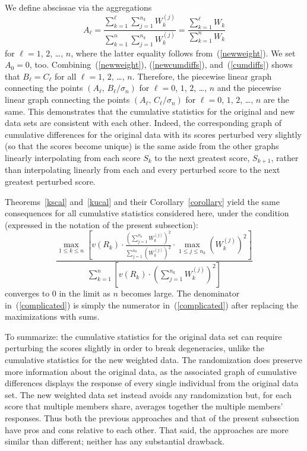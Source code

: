 \documentclass[12pt]{article}
\begin{document}
We define abscissae via the aggregations
%
\begin{equation}
A_{\ell} = \frac{\sum_{k=1}^{\ell} \sum_{j=1}^{n_k} W_k^{(j)}}
                {\sum_{k=1}^n \sum_{j=1}^{n_k} W_k^{(j)}}
         = \frac{\sum_{k=1}^{\ell} W_k}{\sum_{k=1}^n W_k}
\end{equation}
%
for $\ell = 1$, $2$, \dots, $n$, where the latter equality
follows from~(\ref{newweight}). We set $A_0 = 0$, too.
Combining~(\ref{newweight}), (\ref{newcumdiffs}), and~(\ref{cumdiffs})
shows that $B_{\ell} = C_{\ell}$
for all $\ell = 1$, $2$, \dots, $n$.
Therefore, the piecewise linear graph connecting
the points $(A_{\ell},\,B_{\ell} / \sigma_n)$
for $\ell = 0$, $1$, $2$, \dots, $n$
and the piecewise linear graph connecting
the points $(A_{\ell},\,C_{\ell} / \sigma_n)$
for $\ell = 0$, $1$, $2$, \dots, $n$ are the same.
This demonstrates that the cumulative statistics for the original
and new data sets are consistent with each other.
Indeed, the corresponding graph of cumulative differences
for the original data with its scores perturbed very slightly
(so that the scores become unique) is the same
aside from the other graphs linearly interpolating
from each score $S_k$ to the next greatest score, $S_{k+1}$,
rather than interpolating linearly from each and every perturbed score
to the next greatest perturbed score.

Theorems~\ref{kscal} and~\ref{kucal} and their Corollary~\ref{corollary}
yield the same consequences for all cumulative statistics considered here,
under the condition (expressed in the notation of the present subsection):
%
\begin{equation}
\label{complicated}
\frac{\max_{1 \le k \le n}
      \left[ v(R_k) \cdot \frac{\left(\sum_{j=1}^{n_k} W_k^{(j)}\right)^2}
                               {\sum_{j=1}^{n_k} \left(W_k^{(j)}\right)^2}
      \cdot \max_{1 \le j \le n_k} \left(W_k^{(j)}\right)^2 \right]}
     {\sum_{k=1}^n
      \left[ v(R_k) \cdot \left(\sum_{j=1}^{n_k} W_k^{(j)}\right)^2 \right]}
\end{equation}
%
converges to 0 in the limit as $n$ becomes large.
The denominator in~(\ref{complicated}) is simply the numerator
in~(\ref{complicated}) after replacing the maximizations with sums.

To summarize: the cumulative statistics for the original data set
can require perturbing the scores slightly in order to break degeneracies,
unlike the cumulative statistics for the new weighted data.
The randomization does preserve more information about the original data,
as the associated graph of cumulative differences displays
the response of every single individual from the original data set.
The new weighted data set instead avoids any randomization
but, for each score that multiple members share,
averages together the multiple members' responses.
Thus both the previous approaches and that of the present subsection
have pros and cons relative to each other.
That said, the approaches are more similar than different;
neither has any substantial drawback.
\end{document}
